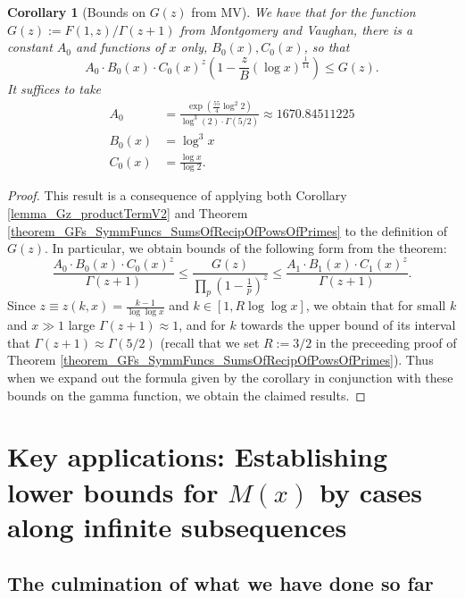 \documentclass[11pt,reqno,a4letter]{article}
\numberwithin{figure}{section}
\numberwithin{table}{section}
\theoremstyle{plain}
\newtheorem{cor}[theorem]{Corollary}
\numberwithin{theorem}{section}
\theoremstyle{definition}
\begin{document}
\begin{cor}[Bounds on $G(z)$ from MV] 
\label{cor_BoundsOnGz_FromMVBook_initial_stmt_v1} 
We have that for the function $G(z) := F(1, z) / \Gamma(z+1)$ from Montgomery and Vaughan, there 
is a constant $A_0$ and functions of $x$ only, $B_0(x), C_0(x)$, so that 
\[
A_0 \cdot B_0(x) \cdot C_0(x)^{z} \left(1 - \frac{z}{B} (\log x)^{\frac{1}{14}}\right) \leq G(z). 
\]
It suffices to take 
\begin{align*} 
A_0 & = \frac{\exp\left(\frac{55}{4} \log^2 2\right)}{\log^3(2) \cdot \Gamma(5/2)} 
     \approx 1670.84511225 \\ 
B_0(x) & = \log^3 x \\ 
C_0(x) & = \frac{\log x}{\log 2}. 
\end{align*} 
\end{cor}
\begin{proof} 
This result is a consequence of applying both 
Corollary \ref{lemma_Gz_productTermV2} and 
Theorem \ref{theorem_GFs_SymmFuncs_SumsOfRecipOfPowsOfPrimes} to the definition of $G(z)$. 
In particular, we obtain bounds of the following form from the theorem: 
\[
\frac{A_0 \cdot B_0(x) \cdot C_0(x)^{z}}{\Gamma(z+1)} \leq 
     \frac{G(z)}{\prod_p \left(1-\frac{1}{p}\right)^{z}} \leq 
     \frac{A_1 \cdot B_1(x) \cdot C_1(x)^{z}}{\Gamma(z+1)}. 
\]
Since $z \equiv z(k, x) = \frac{k-1}{\log\log x}$ and $k \in [1, R\log\log x]$, we obtain that 
for small $k$ and $x \gg 1$ large $\Gamma(z+1) \approx 1$, and for $k$ towards the upper bound of 
its interval that $\Gamma(z+1) \approx \Gamma(5/2)$ (recall that we set $R := 3/2$ in the 
preceeding proof of Theorem \ref{theorem_GFs_SymmFuncs_SumsOfRecipOfPowsOfPrimes}). 
Thus when we expand out the formula given by the corollary in conjunction with these bounds on the 
gamma function, we obtain the claimed results. 
\end{proof} 

\newpage
\section{Key applications: Establishing lower bounds for $M(x)$ by cases along infinite subsequences} 

\subsection{The culmination of what we have done so far} 
\end{document}
